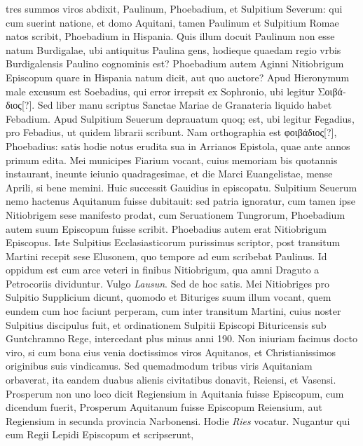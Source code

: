tres summos viros abdixit, Paulinum, Phoebadium, et Sulpitium
Severum:
qui cum suerint natione, et domo Aquitani, tamen
Paulinum et Sulpitium Romae natos scribit, Phoebadium in Hispania.
Quis illum docuit Paulinum non esse natum Burdigalae, ubi
antiquitus Paulina gens, hodieque quaedam regio vrbis Burdigalensis
Paulino cognominis est?
Phoebadium autem Aginni Nitiobrigum
Episcopum quare in Hispania natum dicit, aut quo auctore?
Apud Hieronymum male excusum est Soebadius, qui error irrepsit
ex Sophronio, ubi legitur \textgreek{Σοιβάδιος[?]}.
Sed liber manu scriptus
Sanctae Mariae de Granateria liquido habet Febadium.
Apud Sulpitium
Seuerum deprauatum quoq; est, ubi legitur Fegadius, pro
Febadius, ut quidem librarii scribunt.
Nam orthographia est \textgreek{φοιβάδιος[?]},
Phoebadius: satis hodie notus erudita sua in Arrianos Epistola,
quae ante  annos primum edita.
Mei municipes Fiarium vocant,
cuius memoriam bis quotannis instaurant, ineunte ieiunio
quadragesimae, et die Marci Euangelistae, mense Aprili, si bene
memini.
Huic successit Gauidius in episcopatu.
Sulpitium Seuerum
nemo hactenus Aquitanum fuisse dubitauit: sed patria ignoratur,
cum tamen ipse Nitiobrigem sese manifesto prodat, cum Seruationem
Tungrorum, Phoebadium autem suum Episcopum fuisse scribit.
Phoebadius autem erat Nitiobrigum Episcopus.
Iste Sulpitius
Ecclasiasticorum purissimus scriptor, post transitum Martini recepit
sese Elusonem, quo tempore ad eum scribebat Paulinus.
Id oppidum est cum arce veteri in finibus Nitiobrigum, qua amni Draguto
a Petrocoriis dividuntur.
Vulgo \textit{Lausun}.
Sed de hoc satis.
Mei
Nitiobriges pro Sulpitio Supplicium dicunt, quomodo et Bituriges
suum illum vocant, quem eundem cum hoc faciunt perperam,
cum inter transitum Martini, cuius noster Sulpitius discipulus fuit,
et ordinationem Sulpitii Episcopi Bituricensis sub Guntchramno
Rege, intercedant plus minus anni 190.
Non iniuriam facimus
docto viro, si cum bona eius venia doctissimos viros Aquitanos,
et Christianissimos originibus suis vindicamus.
Sed quemadmodum tribus viris Aquitaniam orbaverat, ita eandem duabus
alienis civitatibus donavit, Reiensi, et Vasensi.
%
Prosperum non uno
loco dicit Regiensium in Aquitania fuisse Episcopum, cum dicendum
fuerit, Prosperum Aquitanum fuisse Episcopum Reiensium,
aut Regiensium in secunda provincia Narbonensi.
Hodie \textit{Ries} vocatur.
Nugantur qui eum Regii Lepidi Episcopum et scripserunt,
